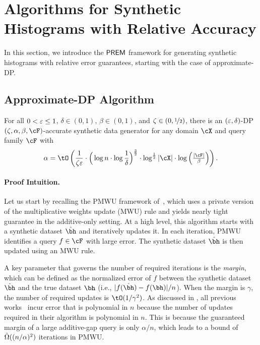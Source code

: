 \section{Algorithms for Synthetic Histograms with Relative Accuracy}\label{sec:upper-bounds}

In this section, we introduce the $\mathsf{PREM}$ framework for generating synthetic histograms with relative error guarantees, starting with the case of approximate-DP.

\subsection{Approximate-DP Algorithm}

\label{sec:approx_DP_synthetic_data}


\begin{theorem} \label{thm:main}
For all $0< \varepsilon \leq 1$, $\delta \in (0, 1)$, $\beta \in (0, 1)$, and $\zeta \in (0, \nicefrac12)$, 
there is an $(\varepsilon, \delta)$-DP $(\zeta,\alpha,\beta,\cF)$-accurate synthetic data generator for any domain $\cX$ and query family $\cF$ with
\[
    \alpha = \tO\prn{\frac{1}{\zeta\eps} \cdot \Big(\log n \cdot  \log\frac1\delta \Big)^{\frac32} \cdot \log^{\frac12} |\cX| \cdot \log \prn{\textstyle \frac{|\cF|}{\beta}}
    }.
\]
\end{theorem}

\paragraph{Proof Intuition.} 
Let us start by recalling the PMWU framework  of~\citet{HardtR10,HardtLM12}, which uses a private version of the multiplicative weights update (MWU) rule and yields nearly tight guarantee in the additive-only setting. At a high level, this algorithm starts with a synthetic dataset $\hbh$ and iteratively updates it. In each iteration, PMWU identifies a query $f \in \cF$ with large error. The synthetic dataset $\hbh$ is then updated using an MWU rule.

A key parameter that governs the number of required iterations is the \emph{margin}, which can be defined as the normalized error of $f$ between the synthetic dataset $\hbh$ and the true dataset $\bh$  (i.e., $|f(\hbh) - f(\bh)| / n$). When the margin is $\gamma$, the number of required updates is $\tO(1/\gamma^2)$. 
%
As discussed in , all previous works~\citep{HardtR10,HardtLM12,GuptaRU12} incur error that is polynomial in $n$ 
because the number of updates required in their  algorithm is polynomial in $n$. 
This is because the guaranteed margin of a large additive-gap query is only 
$\alpha / n$, which leads to a bound of 
$\tilde{\Omega}((n/\alpha)^2)$ iterations in PMWU. 

